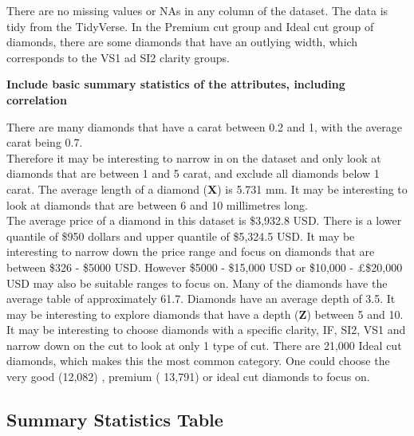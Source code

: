\documentclass[
]{article}
\begin{document}
There are no missing values or NAs in any column of the dataset. The
data is tidy from the TidyVerse. In the Premium cut group and Ideal cut
group of diamonds, there are some diamonds that have an outlying width,
which corresponds to the VS1 ad SI2 clarity groups.

\textbf{Include basic summary statistics of the attributes, including
correlation}

There are many diamonds that have a carat between 0.2 and 1, with the
average carat being 0.7.\\
Therefore it may be interesting to narrow in on the dataset and only
look at diamonds that are between 1 and 5 carat, and exclude all
diamonds below 1 carat. The average length of a diamond (\textbf{X}) is
5.731 mm. It may be interesting to look at diamonds that are between 6
and 10 millimetres long.\\
The average price of a diamond in this dataset is \$3,932.8 USD. There
is a lower quantile of \$950 dollars and upper quantile of \$5,324.5
USD. It may be interesting to narrow down the price range and focus on
diamonds that are between \$326 - \$5000 USD. However \$5000 - \$15,000
USD or \$10,000 - £\$20,000 USD may also be suitable ranges to focus on.
Many of the diamonds have the average table of approximately 61.7.
Diamonds have an average depth of 3.5. It may be interesting to explore
diamonds that have a depth (\textbf{Z}) between 5 and 10. It may be
interesting to choose diamonds with a specific clarity, IF, SI2, VS1 and
narrow down on the cut to look at only 1 type of cut. There are 21,000
Ideal cut diamonds, which makes this the most common category. One could
choose the very good (12,082) , premium ( 13,791) or ideal cut diamonds
to focus on.

\subsection{Summary Statistics Table}\label{summary-statistics-table}
\end{document}
